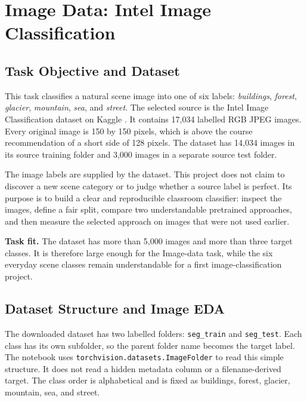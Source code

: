 \section{Image Data: Intel Image Classification}
\label{sec:image}

\subsection{Task Objective and Dataset}

This task classifies a natural scene image into one of six labels: \textit{buildings}, \textit{forest}, \textit{glacier}, \textit{mountain}, \textit{sea}, and \textit{street}. The selected source is the Intel Image Classification dataset on Kaggle \cite{intel}. It contains 17,034 labelled RGB JPEG images. Every original image is 150 by 150 pixels, which is above the course recommendation of a short side of 128 pixels. The dataset has 14,034 images in its source training folder and 3,000 images in a separate source test folder.

The image labels are supplied by the dataset. This project does not claim to discover a new scene category or to judge whether a source label is perfect. Its purpose is to build a clear and reproducible classroom classifier: inspect the images, define a fair split, compare two understandable pretrained approaches, and then measure the selected approach on images that were not used earlier.

\begin{importantbox}
\textbf{Task fit.} The dataset has more than 5,000 images and more than three target classes. It is therefore large enough for the Image-data task, while the six everyday scene classes remain understandable for a first image-classification project.
\end{importantbox}

\subsection{Dataset Structure and Image EDA}

The downloaded dataset has two labelled folders: \texttt{seg\_train} and \texttt{seg\_test}. Each class has its own subfolder, so the parent folder name becomes the target label. The notebook uses \texttt{torchvision.datasets.ImageFolder} to read this simple structure. It does not read a hidden metadata column or a filename-derived target. The class order is alphabetical and is fixed as buildings, forest, glacier, mountain, sea, and street.

